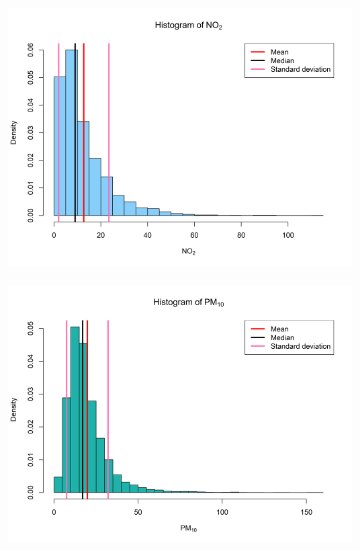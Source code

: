 \documentclass[a4paper, 10pt]{article}
\begin{document}
\begin{flushleft}
      \begin{figure}[H]
         \centering
         \begin{subfigure}[t]{0.48\linewidth}
            \centering
            \includegraphics[width=\linewidth]{../images/no2_hist_2019.png}
         \end{subfigure}
         \hfill
         \begin{subfigure}[t]{0.48\linewidth}
            \centering
            \includegraphics[width=\linewidth]{../images/pm10_hist_2019.png}
         \end{subfigure}

         \vfill


\end{figure}
\end{flushleft}
\end{document}
